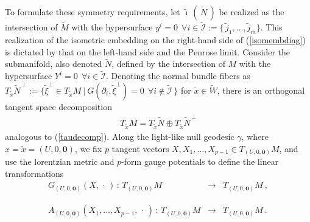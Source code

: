 \documentclass[11pt,a4paper]{article}
\newcommand{\mbf}[1]{{\boldsymbol {#1} }}
\def\nn{\nonumber}
\def\bea{\begin{eqnarray}}
\def\eea{\end{eqnarray}}
\newcommand{\beq}{\begin{eqnarray}}
\newcommand{\eeq}{\end{eqnarray}}
\begin{document}
To formulate these symmetry requirements, let
$\widetilde{\imath}\,(\,\widetilde{N}\,)$ be realized as the
intersection of $\widetilde{M}$ with the hypersurface $y^i=0~~\forall
i\in\widetilde{\mathcal I}:=\{\,\tilde j_1,\dots,\tilde j_m\}$. This
realization of the isometric embedding on the right-hand side of
(\ref{isomembdiag}) is dictated by that on the left-hand side and the
Penrose limit. Consider the submanifold, also denoted
$\widetilde{N}$, defined by the intersection of $M$ with the
hypersurface $Y^i=0~~\forall i\in\widetilde{\mathcal I}$. Denoting the
normal bundle fibers as $T_{\tilde
  x}\widetilde{N}^{\,\perp}:=\{\tilde\xi^\perp\in T_{\tilde
  x}M~|~G(\partial_i,\tilde\xi^\perp)=0~~\forall
i\notin\widetilde{\mathcal I}\,\}$ for $\tilde x\in\widetilde{W}$, there
is an orthogonal tangent space decomposition
\beq
T_{\tilde x}M=T_{\tilde x}\widetilde{N}\oplus T_{\tilde x}
\widetilde{N}^{\,\perp}
\label{tautildedecomp}\eeq
analogous to (\ref{taudecomp}). Along the light-like null geodesic
$\gamma$, where $x=\tilde x=(U,0,\mbf0)$, we fix $p$ tangent vectors
$X,X_1,\dots,X_{p-1}\in T_{(U,0,\mbf0)}M$, and use the lorentzian metric
and $p$-form gauge potentials to define the linear transformations
\bea
G_{(U,0,\mbf0)}(X,\,\cdot\,)\,:\,T_{(U,0,\mbf0)}M&\longrightarrow&
T_{(U,0,\mbf0)}M \ , \label{Gelinmap}\\&&{~~~~}^{~~}_{~~}\nn\\
A_{(U,0,\mbf0)}(X_1,\dots,X_{p-1},\,\cdot\,)\,:\,T_{(U,0,\mbf0)}M&
\longrightarrow&T_{(U,0,\mbf0)}M \ .
\label{Aelinmap}\eea
\end{document}
